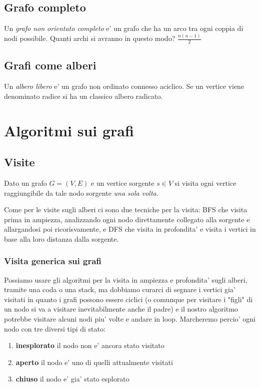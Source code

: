 \documentclass{article}
\begin{document}
\subsection{Grafo completo}

Un \emph{grafo non orientato completo} e' un grafo che ha un arco tra ogni coppia
di nodi possibile. Quanti archi si avranno in questo modo? $\frac{n(n-1)}{2}$

\subsection{Grafi come alberi}

Un \emph{albero libero} e' un grafo non ordinato connesso aciclico. Se un vertice
viene denominato radice si ha un classico albero radicato.

\section{Algoritmi sui grafi}

\subsection{Visite}

Dato un grafo $G = (V, E)$ e un vertice sorgente $s \in V$ si visita ogni vertice
raggiungibile da tale nodo sorgente \emph{una sola volta}.

Come per le visite sugli alberi ci sono due tecniche per la visita: BFS che visita
prima in ampiezza, analizzando ogni nodo direttamente collegato alla sorgente e 
allargandosi poi ricorisvamente, e DFS che visita in profondita' e visita i vertici
in base alla loro distanza dalla sorgente.

\subsubsection{Visita generica sui grafi}

Possiamo usare gli algoritmi per la visita in ampiezza e profondita' sugli alberi,
tramite una coda o una stack, ma dobbiamo curarci di segnare i vertici gia' visitati
in quanto i grafi possono essere ciclici (o comunque per visitare i "figli" di
un nodo si va a visitare inevitabilmente anche il padre) e il nostro algoritmo
potrebbe visitare alcuni nodi piu' volte e andare in loop. Marcheremo percio'
ogni nodo con tre diversi tipi di stato:

\begin{enumerate}
  \item \textbf{inesplorato} il nodo non e' ancora stato visitato
  \item \textbf{aperto} il nodo e' uno di quelli attualmente visitati
  \item \textbf{chiuso} il nodo e' gia' stato esplorato
\end{enumerate}
\end{document}
